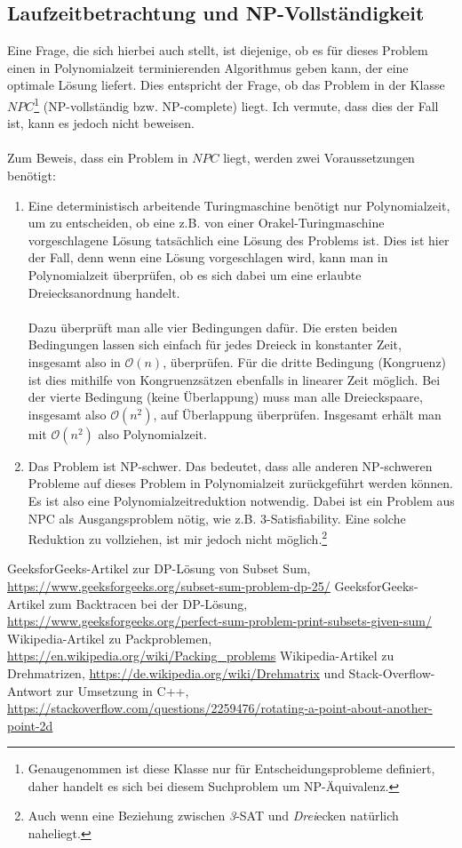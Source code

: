 \documentclass[a4paper, notitlepage, 12pt]{scrartcl}
\begin{document}
 \subsection{Laufzeitbetrachtung und NP-Vollständigkeit}
 Eine Frage, die sich hierbei auch stellt, ist diejenige, ob es für dieses Problem einen in Polynomialzeit terminierenden Algorithmus geben kann, der eine optimale Lösung liefert. Dies entspricht der Frage, ob das Problem in der Klasse $NPC$\footnote{Genaugenommen ist diese Klasse nur für Entscheidungsprobleme definiert, daher handelt es sich bei diesem Suchproblem um NP-Äquivalenz.} (NP-vollständig bzw. NP-complete) liegt. Ich vermute, dass dies der Fall ist, kann es jedoch nicht beweisen. \\ \\
 Zum Beweis, dass ein Problem in $NPC$ liegt, werden zwei Voraussetzungen benötigt:
 \begin{enumerate}
 	\item Eine deterministisch arbeitende Turingmaschine benötigt nur Polynomialzeit, um zu entscheiden, ob eine z.B. von einer Orakel-Turingmaschine vorgeschlagene Lösung tatsächlich eine Lösung des Problems ist. Dies ist hier der Fall, denn wenn eine Lösung vorgeschlagen wird, kann man in Polynomialzeit überprüfen, ob es sich dabei um eine erlaubte Dreiecksanordnung handelt. \\ \\ Dazu überprüft man alle vier Bedingungen dafür. Die ersten beiden Bedingungen lassen sich einfach für jedes Dreieck in konstanter Zeit, insgesamt also in $\mathcal{O}(n)$, überprüfen. Für die dritte Bedingung (Kongruenz) ist dies mithilfe von Kongruenzsätzen ebenfalls in linearer Zeit möglich. Bei der vierte Bedingung  (keine Überlappung) muss man alle Dreieckspaare, insgesamt also $\mathcal{O}(n^2)$, auf Überlappung überprüfen. Insgesamt erhält man mit $\mathcal{O}(n^2)$ also Polynomialzeit.
 	\item Das Problem ist NP-schwer. Das bedeutet, dass alle anderen NP-schweren Probleme auf dieses Problem in Polynomialzeit zurückgeführt werden können. Es ist also eine Polynomialzeitreduktion notwendig. Dabei ist ein Problem aus NPC als Ausgangsproblem nötig, wie z.B. 3-Satisfiability. Eine solche Reduktion zu vollziehen, ist mir jedoch nicht möglich.\footnote{Auch wenn eine Beziehung zwischen \textit{3}-SAT und \textit{Drei}ecken natürlich naheliegt.}
 \end{enumerate}
\begin{thebibliography}{xx}
	 GeeksforGeeks-Artikel zur DP-Lösung von Subset Sum, \url{https://www.geeksforgeeks.org/subset-sum-problem-dp-25/}
	 GeeksforGeeks-Artikel zum Backtracen bei der DP-Lösung, \url{https://www.geeksforgeeks.org/perfect-sum-problem-print-subsets-given-sum/}
	 Wikipedia-Artikel zu Packproblemen, \url{https://en.wikipedia.org/wiki/Packing_problems}
	 Wikipedia-Artikel zu Drehmatrizen, \url{https://de.wikipedia.org/wiki/Drehmatrix} und Stack-Overflow-Antwort zur Umsetzung in C++, \url{https://stackoverflow.com/questions/2259476/rotating-a-point-about-another-point-2d}
\end{thebibliography}
\end{document}
